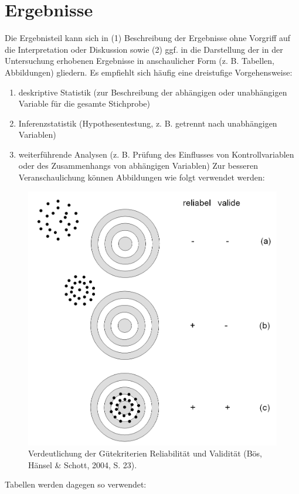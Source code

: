 \chapter{Ergebnisse}
Die Ergebnisteil kann sich in (1) Beschreibung der Ergebnisse ohne Vorgriff auf die Interpretation oder Diskussion sowie (2) ggf. in die Darstellung der in der Untersuchung erhobenen Ergebnisse in anschaulicher Form (z. B. Tabellen, Abbildungen) gliedern. Es empfiehlt sich häufig eine dreistufige Vorgehensweise:
\begin{enumerate}
	\item deskriptive Statistik (zur Beschreibung der abhängigen oder unabhängigen Variable für die gesamte Stichprobe)
	\item Inferenzstatistik (Hypothesentestung, z. B. getrennt nach unabhängigen Variablen)
	\item weiterführende Analysen (z. B. Prüfung des Einflusses von Kontrollvariablen oder des Zusammenhangs von abhängigen Variablen)
	Zur besseren Veranschaulichung können Abbildungen wie folgt verwendet werden:	
\end{enumerate}
\begin{figure}[h]
	\centering
	\includegraphics[width=0.7\linewidth]{images/guetekriterien-reliabilitaet-und-variabilitaet}
	\caption{Verdeutlichung der Gütekriterien Reliabilität und Validität (Bös, Hänsel \& Schott, 2004, S. 23).}
	\label{fig:guetekriterien-reliabilitaet-und-variabilitaet}
\end{figure}
Tabellen werden dagegen so verwendet:
